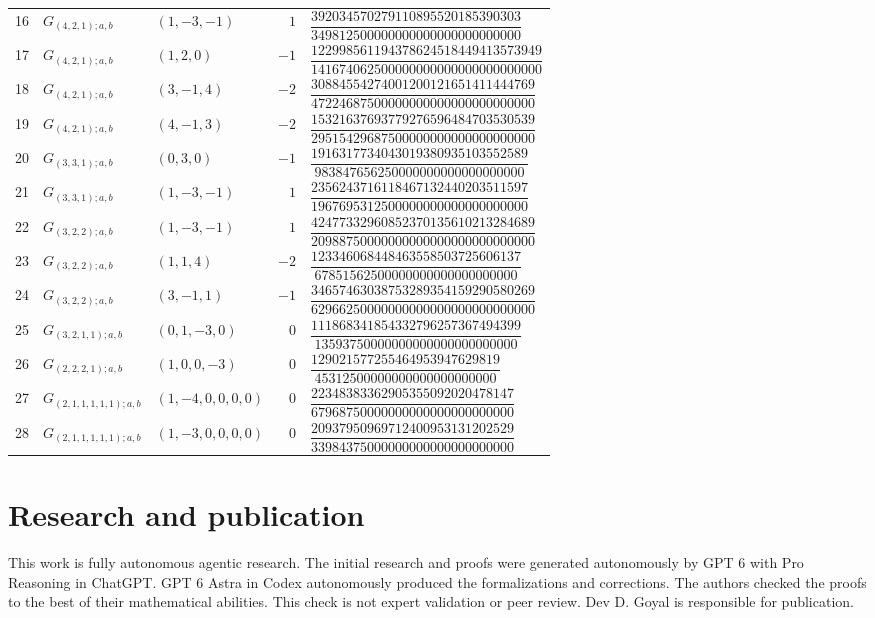 \documentclass[11pt]{article}
\begin{document}
\begin{longtable}{@{}rllrl@{}}
16 & \(G_{(4,2,1);a,b}\) & \((1,-3,-1)\) & \(1\) & \(\dfrac{392034570279110895520185390303}{349812500000000000000000000000}\) \\[6pt]
17 & \(G_{(4,2,1);a,b}\) & \((1,2,0)\) & \(-1\) & \(\dfrac{122998561194378624518449413573949}{141674062500000000000000000000000}\) \\[6pt]
18 & \(G_{(4,2,1);a,b}\) & \((3,-1,4)\) & \(-2\) & \(\dfrac{30884554274001200121651411444769}{47224687500000000000000000000000}\) \\[6pt]
19 & \(G_{(4,2,1);a,b}\) & \((4,-1,3)\) & \(-2\) & \(\dfrac{15321637693779276596484703530539}{29515429687500000000000000000000}\) \\[6pt]
20 & \(G_{(3,3,1);a,b}\) & \((0,3,0)\) & \(-1\) & \(\dfrac{1916317734043019380935103552589}{983847656250000000000000000000}\) \\[6pt]
21 & \(G_{(3,3,1);a,b}\) & \((1,-3,-1)\) & \(1\) & \(\dfrac{2356243716118467132440203511597}{1967695312500000000000000000000}\) \\[6pt]
22 & \(G_{(3,2,2);a,b}\) & \((1,-3,-1)\) & \(1\) & \(\dfrac{42477332960852370135610213284689}{20988750000000000000000000000000}\) \\[6pt]
23 & \(G_{(3,2,2);a,b}\) & \((1,1,4)\) & \(-2\) & \(\dfrac{123346068448463558503725606137}{67851562500000000000000000000}\) \\[6pt]
24 & \(G_{(3,2,2);a,b}\) & \((3,-1,1)\) & \(-1\) & \(\dfrac{34657463038753289354159290580269}{62966250000000000000000000000000}\) \\[6pt]
25 & \(G_{(3,2,1,1);a,b}\) & \((0,1,-3,0)\) & \(0\) & \(\dfrac{111868341854332796257367494399}{13593750000000000000000000000}\) \\[6pt]
26 & \(G_{(2,2,2,1);a,b}\) & \((1,0,0,-3)\) & \(0\) & \(\dfrac{129021577255464953947629819}{45312500000000000000000000}\) \\[6pt]
27 & \(G_{(2,1,1,1,1,1);a,b}\) & \((1,-4,0,0,0,0)\) & \(0\) & \(\dfrac{22348383362905355092020478147}{67968750000000000000000000000}\) \\[6pt]
28 & \(G_{(2,1,1,1,1,1);a,b}\) & \((1,-3,0,0,0,0)\) & \(0\) & \(\dfrac{20937950969712400953131202529}{33984375000000000000000000000}\) \\[6pt]
\end{longtable}
\endgroup

\section*{Research and publication}
This work is fully autonomous agentic research. The initial research and proofs were generated autonomously by GPT 6 with Pro Reasoning in ChatGPT. GPT 6 Astra in Codex autonomously produced the formalizations and corrections. The authors checked the proofs to the best of their mathematical abilities. This check is not expert validation or peer review. Dev D. Goyal is responsible for publication.
\end{document}
